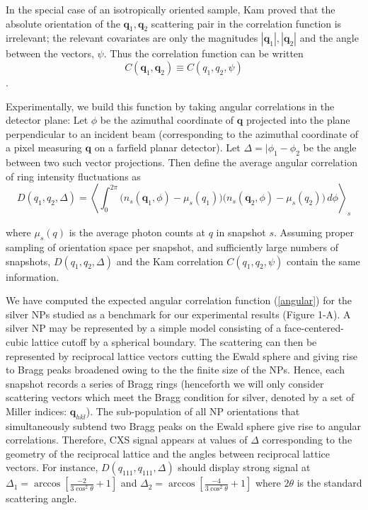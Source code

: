 \documentclass [11pt,fleqn]{article}
\def \be {\begin{equation}}
\def \ee {\end{equation}}
\begin{document}
In the special case of an isotropically oriented sample, Kam proved that the absolute orientation of the $\bm q_1, \bm q_2$ scattering pair in the correlation function is irrelevant; the relevant covariates are only the magnitudes $| \bm q_1 | , | \bm q_2 | $ and the angle between the vectors, $\psi$. Thus the correlation function can be written 
\[
C(\bm q_1, \bm q_2)  \equiv C (q_1,q_2, \psi  )
\]. 

Experimentally, we build this function by taking angular correlations in the detector plane: Let $\phi$ be the azimuthal coordinate of $\bm q$ projected into the plane perpendicular to an incident beam (corresponding to the azimuthal coordinate of a pixel measuring $\bm q$ on a farfield planar detector). Let $\Delta = |\phi_{1} - \phi_{2}$ be the angle between two such vector projections. Then define the average angular correlation of ring intensity fluctuations as
\be \label{angular}
D (q_1,q_2, \Delta  ) = \left \langle \int_{0}^{2\pi}  \Big ( n_s(\bm q_1,\phi) -   \mu_s( q_1) \Big) \Big ( n_s(\bm q_2,\phi) -   \mu_s( q_2) \Big)  \, d\phi  \right \rangle_{s}
\ee

where $\mu_s( q)$ is the average photon counts at $q$ in snapshot $s$. Assuming proper sampling of orientation space per snapshot, and sufficiently large numbers of snapshots, $D (q_1,q_2, \Delta  )$ and the Kam correlation $C (q_1,q_2, \psi  )$ contain the same information.

We have computed the expected angular correlation function (\ref{angular}) for the silver NPs studied as a benchmark for our experimental results (Figure 1-A). A silver NP may be represented by a simple model consisting of a face-centered-cubic lattice cutoff by a spherical boundary. The scattering can then be represented by reciprocal lattice vectors cutting the Ewald sphere and giving rise to Bragg peaks broadened owing to the the finite size of the NPs. Hence, each snapshot records a series of Bragg rings (henceforth we will only consider scattering vectors which meet the Bragg condition for silver, denoted by a set of Miller indices: $\bm q_{hkl}$). The sub-population of all NP orientations that simultaneously subtend two Bragg peaks on the Ewald sphere give rise to angular correlations. Therefore,  CXS signal appears at values of $\Delta $ corresponding to the geometry of the reciprocal lattice and the angles between reciprocal lattice vectors. For instance, $D (q_{111},q_{111}, \Delta  )$ should display strong signal at $\Delta_1 = \arccos[ \frac{-2}{3\cos^{2}\theta} + 1  ]$ and $\Delta_2 = \arccos[ \frac{-4}{3\cos^{2}\theta} + 1  ]$ where $2\theta$ is the standard scattering angle.
\end{document}
